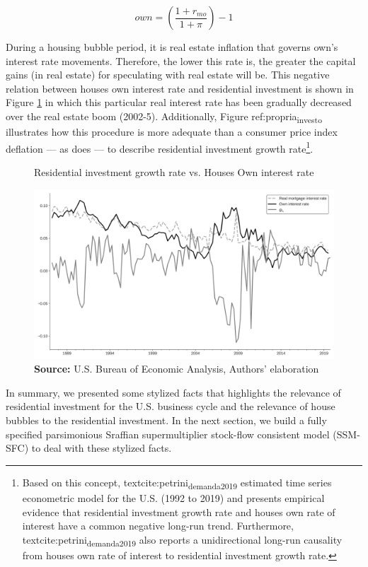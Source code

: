 \documentclass[12pt]{article}
\begin{document}
\begin{equation}
\label{_own}
own = \left(\frac{1+r_{mo}}{1+\pi}\right) -1
\end{equation}

During a housing bubble period, it is real estate inflation that governs own's interest rate movements. Therefore, the lower this rate is, the greater the capital gains (in real estate) for speculating with real estate will be. This negative relation between houses own interest rate and residential investment is shown in Figure \ref{propria_investo} in which this particular real interest rate has been gradually decreased over the real estate boom (2002-5).
Additionally, Figure ref:propria\textsubscript{investo} illustrates how this  procedure is more adequate than a consumer price index deflation --- as \textcite[p.~143--6]{fair_macroeconometric_2013} does --- to describe residential investment growth rate\footnote{Based on this concept, textcite:petrini\textsubscript{demanda}\textsubscript{2019} estimated time series econometric model for the U.S. (1992 to 2019) and presents empirical evidence that residential investment growth rate and houses own rate of interest have a common negative long-run trend.  Furthermore, textcite:petrini\textsubscript{demanda}\textsubscript{2019} also reports a unidirectional long-run causality from houses own rate of interest to residential investment growth rate.}.


\begin{figure}[htb]
	\centering
	\caption{Residential investment growth rate vs. Houses Own interest rate}
	\label{propria_investo}
	\includegraphics[width=.8\textwidth]{./figs/Own_gI}
	\caption*{\textbf{Source:} U.S. Bureau of Economic Analysis, Authors' elaboration}
\end{figure}


In summary, we presented some stylized facts that highlights the relevance of residential investment for the U.S. business cycle and the relevance of house bubbles to the residential investment.
In the next section, we build a fully specified parsimonious Sraffian supermultiplier stock-flow consistent model (SSM-SFC) to deal with these stylized facts.
\end{document}
